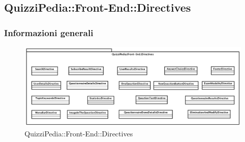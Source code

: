 \newpage

\subsection{QuizziPedia::Front-End::Directives}

\subsubsection{Informazioni generali}
\label{QuizziPedia::Front-End::Directives}
\begin{figure} [ht]
	\centering
	\includegraphics[scale=0.40]{UML/Package/QuizziPedia_Front-End_Directives.png}
	\caption{QuizziPedia::Front-End::Directives}
\end{figure}
